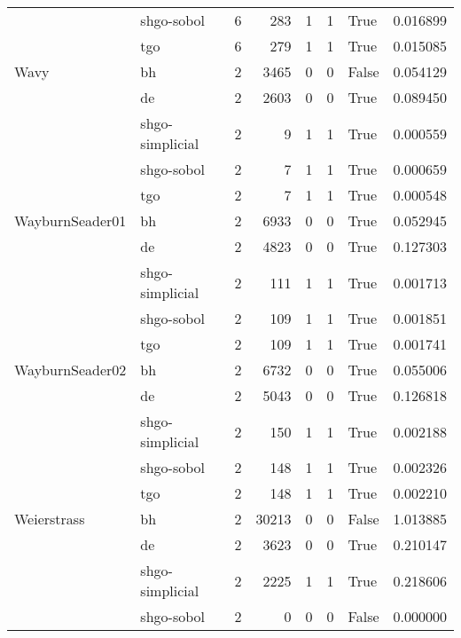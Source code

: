 \begin{longtable}{llrrrrlr}
         & shgo-sobol &     6 &      283 &      1 &       1 &    True &    0.016899 \\
         & tgo &     6 &      279 &      1 &       1 &    True &    0.015085 \\
Wavy & bh &     2 &     3465 &      0 &       0 &   False &    0.054129 \\
         & de &     2 &     2603 &      0 &       0 &    True &    0.089450 \\
         & shgo-simplicial &     2 &        9 &      1 &       1 &    True &    0.000559 \\
         & shgo-sobol &     2 &        7 &      1 &       1 &    True &    0.000659 \\
         & tgo &     2 &        7 &      1 &       1 &    True &    0.000548 \\
WayburnSeader01 & bh &     2 &     6933 &      0 &       0 &    True &    0.052945 \\
         & de &     2 &     4823 &      0 &       0 &    True &    0.127303 \\
         & shgo-simplicial &     2 &      111 &      1 &       1 &    True &    0.001713 \\
         & shgo-sobol &     2 &      109 &      1 &       1 &    True &    0.001851 \\
         & tgo &     2 &      109 &      1 &       1 &    True &    0.001741 \\
WayburnSeader02 & bh &     2 &     6732 &      0 &       0 &    True &    0.055006 \\
         & de &     2 &     5043 &      0 &       0 &    True &    0.126818 \\
         & shgo-simplicial &     2 &      150 &      1 &       1 &    True &    0.002188 \\
         & shgo-sobol &     2 &      148 &      1 &       1 &    True &    0.002326 \\
         & tgo &     2 &      148 &      1 &       1 &    True &    0.002210 \\
Weierstrass & bh &     2 &    30213 &      0 &       0 &   False &    1.013885 \\
         & de &     2 &     3623 &      0 &       0 &    True &    0.210147 \\
         & shgo-simplicial &     2 &     2225 &      1 &       1 &    True &    0.218606 \\
         & shgo-sobol &     2 &        0 &      0 &       0 &   False &    0.000000 \\

\end{longtable}
